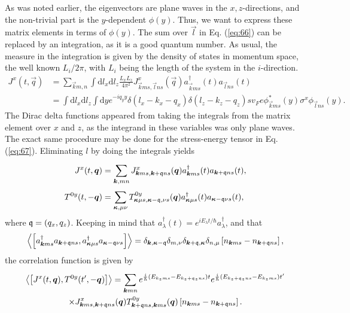 As was noted earlier, the eigenvectors are plane waves in the $x, z$-directions, and the non-trivial part is the $y$-dependent $\phi (y)$.
Thus, we want to express these matrix elements in terms of $\phi (y)$.
The sum over $\vec{l}$ in Eq. (\ref{eq:66}) can be replaced by an integration, as it is a good quantum number.
As usual, the measure in the integration is given by the density of states in momentum space, the well known $L_{i} /2\pi $, with $L_i$ being the length of the system in the $i$-direction.
\begin{align}
  J^x(t, \vec{q}) &= \sum\limits_{\vec{k}m, n}^{} \int \mathrm{d}l_x \mathrm{d}l_z \frac{L_xL_z}{4 \pi ^2}
                    J^x_{\vec{k}ms, \vec{l}ns} (\vec{q}) a^{\dagger}_{\vec{k} ms} (t) a_{\vec{l} ns}(t)\\
  \nonumber &= \int \mathrm{d}l_x \mathrm{d} l_{z} \int \mathrm{d} y e^{-i q_y y}
                    \delta (l_x - k_x - q_x) \delta (l_z - k_z -  q_z)
                    sv_F e \phi ^{*}_{\vec{k} ms}(y) \sigma ^x \phi _{\vec{l}ns}(y).
\end{align}
The Dirac delta functions appeared from taking the integrals from the matrix element over $x$ and $z$, as the integrand in these variables was only plane waves.
The exact same procedure may be done for the stress-energy tensor in Eq. (\ref{eq:67}).
Eliminating $l$ by doing the integrals yields
\begin{align}
  J^x(t, \bm{q}) &= \sum\limits_{\bm{k}, mn}^{}
                    J^x_{\bm{k}ms, \bm{k}+\mathfrak{q} ns}(\bm{q}) a^{\dagger}_{\bm{k} ms}(t) a_{\bm{k}+\mathfrak{q} ns}(t),\\
  T^{0y}(t, -\bm{q}) &= \sum\limits_{\bm{\kappa}, \mu  \nu }^{} T^{0y}_{\bm{\kappa } \mu  s, \bm{\kappa } - \mathfrak{q}, \nu  s}(\bm{q}) a^{\dagger}_{\bm{\kappa } \mu   s}(t) a_{\bm{\kappa } - \mathfrak{q} \nu  s}(t),
\end{align}
where ${\mathfrak{q}} = (q_x, q_z)$.
Keeping in mind that $a_{\lambda }^{\dagger} (t) = e^{i E_{\lambda } t / \hbar }a_{\lambda }^{\dagger}$, and that
\begin{equation}
  \Braket{\left[
a^{\dagger}_{\bm{k}ms} a_{\bm{k}+\mathfrak{q} ns}, a^{\dagger}_{\bm{\kappa}\mu s} a_{\bm{\kappa}-\mathfrak{q} \nu  s}
\right]}
=
\delta_{\bm{k}, \bm{\kappa}-\mathfrak{q}}
\delta _{m, \nu }
\delta _{\bm{k}+\mathfrak{q}, \bm{\kappa}}
\delta _{n, \mu }
\left[ n_{\bm{k}ms}- n_{\bm{k}+\mathfrak{q} ns} \right],
\end{equation}
the correlation function is given by
\begin{multline}
  \Braket{\left[ J^x(t, \bm{q}), T^{0y}(t', -\bm{q}) \right]}
  =
  \sum\limits_{\bm{k} mn}^{}
  e^{\frac{i}{\hbar }( E_{k_zms} - E_{k_z+\mathfrak{q}_z ns} )t}
  e^{\frac{i}{\hbar }( E_{k_z+\mathfrak{q}_z ns} - E_{k_z ms} ) t'}\\
  \times
  J^x_{\bm{k}ms, \bm{k}+\mathfrak{q}ns}(\bm{q})
  T^{0y}_{\bm{k}+\mathfrak{q}ns, \bm{k}ms}(\bm{q})
  \left[ n_{\bm{k}ms}- n_{\bm{k}+\mathfrak{q} ns} \right].
\end{multline}

